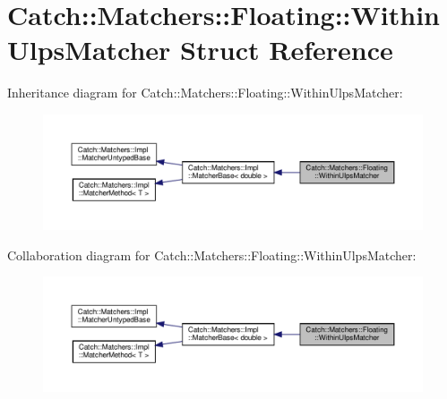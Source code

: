 \hypertarget{structCatch_1_1Matchers_1_1Floating_1_1WithinUlpsMatcher}{}\section{Catch\+::Matchers\+::Floating\+::Within\+Ulps\+Matcher Struct Reference}
\label{structCatch_1_1Matchers_1_1Floating_1_1WithinUlpsMatcher}


Inheritance diagram for Catch\+::Matchers\+::Floating\+::Within\+Ulps\+Matcher\+:
\nopagebreak
\begin{figure}[H]
\begin{center}
\leavevmode
\includegraphics[width=350pt]{structCatch_1_1Matchers_1_1Floating_1_1WithinUlpsMatcher__inherit__graph}
\end{center}
\end{figure}


Collaboration diagram for Catch\+::Matchers\+::Floating\+::Within\+Ulps\+Matcher\+:
\nopagebreak
\begin{figure}[H]
\begin{center}
\leavevmode
\includegraphics[width=350pt]{structCatch_1_1Matchers_1_1Floating_1_1WithinUlpsMatcher__coll__graph}
\end{center}
\end{figure}
